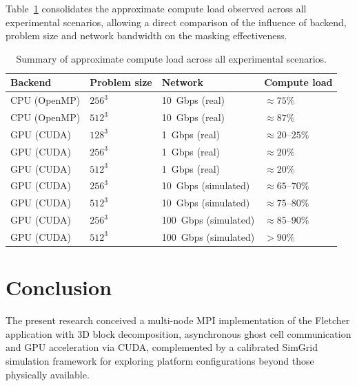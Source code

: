 \documentclass[cic,tc,english]{infufrgs}
\begin{document}
Table~\ref{tab:results_summary} consolidates the approximate compute
load observed across all experimental scenarios, allowing a direct
comparison of the influence of backend, problem size and network
bandwidth on the masking effectiveness.

\begin{table}[H]
  \centering
  \caption{Summary of approximate compute load across all
  experimental scenarios.}
  \label{tab:results_summary}
  \begin{tabular}{llll}
    \hline
    Backend & Problem size & Network & Compute load \\
    \hline
    CPU (OpenMP) & $256^3$ & 10~Gbps (real)        & $\approx 75\%$    \\
    CPU (OpenMP) & $512^3$ & 10~Gbps (real)        & $\approx 87\%$    \\
    GPU (CUDA)   & $128^3$ & 1~Gbps (real)         & $\approx 20$--$25\%$ \\
    GPU (CUDA)   & $256^3$ & 1~Gbps (real)         & $\approx 20\%$    \\
    GPU (CUDA)   & $512^3$ & 1~Gbps (real)         & $\approx 20\%$    \\
    GPU (CUDA)   & $256^3$ & 10~Gbps (simulated)   & $\approx 65$--$70\%$ \\
    GPU (CUDA)   & $512^3$ & 10~Gbps (simulated)   & $\approx 75$--$80\%$ \\
    GPU (CUDA)   & $256^3$ & 100~Gbps (simulated)  & $\approx 85$--$90\%$ \\
    GPU (CUDA)   & $512^3$ & 100~Gbps (simulated)  & $> 90\%$          \\
    \hline
  \end{tabular}
\end{table}

\chapter{Conclusion}
\label{ch:conclusion}
The present research conceived a multi-node MPI implementation of
the Fletcher application with 3D block decomposition, asynchronous
ghost cell communication and GPU acceleration via CUDA, complemented
by a calibrated SimGrid simulation framework for exploring platform
configurations beyond those physically available.
\end{document}
